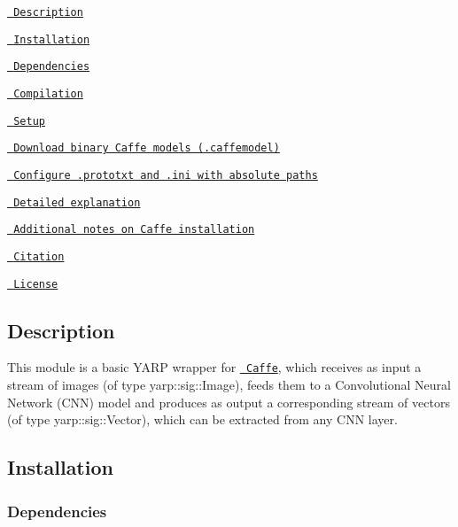 
\begin{DoxyItemize}
\item \href{\#description}{\texttt{ Description}}
\item \href{\#installation}{\texttt{ Installation}}
\begin{DoxyItemize}
\item \href{\#dependencies}{\texttt{ Dependencies}}
\item \href{\#compilation}{\texttt{ Compilation}}
\end{DoxyItemize}
\item \href{\#setup}{\texttt{ Setup}}
\begin{DoxyItemize}
\item \href{\#download-binary-caffe-models-caffemodel}{\texttt{ Download binary Caffe models (.caffemodel)}}
\item \href{\#configure-prototxt-and-ini-with-absolute-paths}{\texttt{ Configure .prototxt and .ini with absolute paths}}
\end{DoxyItemize}
\item \href{\#detailed-explanation}{\texttt{ Detailed explanation}}
\item \href{\#additional-notes-on-caffe-installation}{\texttt{ Additional notes on Caffe installation}}
\item \href{\#citation}{\texttt{ Citation}}
\item \href{\#license}{\texttt{ License}}
\end{DoxyItemize}

\subsection*{Description}

This module is a basic Y\+A\+RP wrapper for \href{http://caffe.berkeleyvision.org/}{\texttt{ Caffe}}, which receives as input a stream of images (of type {\ttfamily yarp\+::sig\+::\+Image}), feeds them to a Convolutional Neural Network (C\+NN) model and produces as output a corresponding stream of vectors (of type {\ttfamily yarp\+::sig\+::\+Vector}), which can be extracted from any C\+NN layer.

\subsection*{Installation}

\subsubsection*{Dependencies}

